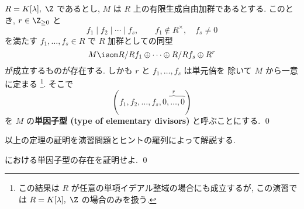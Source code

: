 \documentclass[12pt,twoside]{jarticle}
\begin{document}

\begin{theorem}
\label{theorem:fg-PID-modules}
  $R=K[\lambda],\;\Z$ であるとし, $M$ は $R$ 上の有限生成自由加群であるとする.
  このとき, $r\in\Z_{\ge0}$ と
  \begin{equation*}
    f_1\mid f_2\mid\cdots\mid f_s, \qquad 
    f_1\not\in R^\times, \quad 
    f_s\ne 0
  \end{equation*}
  を満たす $f_1,\dots,f_s\in R$ で $R$ 加群としての同型
  \begin{equation*}
    M \isom R/Rf_1\oplus\cdots\oplus R/Rf_s\oplus R^r
  \end{equation*}
  が成立するものが存在する. しかも $r$ と $f_1,\dots,f_s$ は単元倍を
  除いて $M$ から一意に定まる%
  \footnote{この結果は $R$ が任意の単項イデアル整域の場合にも成立するが,
    この演習では $R=K[\lambda],\;\Z$ の場合のみを扱う.}. 
  そこで 
  \begin{equation*}
    (f_1,f_2,\dots,f_s, \overbrace{0,\dots,0}^r)
  \end{equation*}
  を $M$ の{\bf 単因子型 (type of elementary divisors)} と呼ぶことにする.
  \qed
\end{theorem}

以上の定理の証明を演習問題とヒントの羅列によって解説する.


\begin{question}[単因子型の存在]
\label{q:exists-type-of-ed}
  における単因子型の存在を証明せよ.
  \qed
\end{question}
\end{document}
